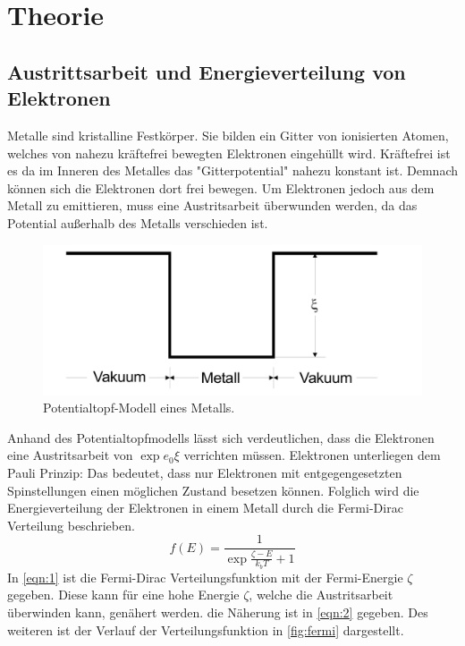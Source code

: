 \section{Theorie}
\label{sec:Theorie}
\subsection{Austrittsarbeit und Energieverteilung von Elektronen}
Metalle sind kristalline Festkörper. Sie bilden ein Gitter von 
ionisierten Atomen, welches von nahezu kräftefrei bewegten Elektronen 
eingehüllt wird. Kräftefrei ist es da im Inneren des Metalles das "Gitterpotential"
nahezu konstant ist. Demnach können sich die Elektronen dort frei bewegen. Um Elektronen jedoch 
aus dem Metall zu emittieren, muss eine Austritsarbeit überwunden werden, da das Potential außerhalb 
des Metalls verschieden ist.
\begin{figure}[H]
    \centering
        \centering
        \includegraphics[width=\textwidth]{Bilder/potentialtopf.jpg}
        \caption{Potentialtopf-Modell eines Metalls. \cite{anleitung4}}
    \hfill
    \label{fig:phasendiagramm}
\end{figure}
\noindent Anhand des Potentialtopfmodells lässt sich verdeutlichen, dass die Elektronen eine 
Austritsarbeit von $\exp e_0 \xi$ verrichten müssen.
\noindent Elektronen unterliegen dem Pauli Prinzip: Das bedeutet, dass nur Elektronen mit
entgegengesetzten Spinstellungen einen möglichen Zustand besetzen können.
Folglich wird die Energieverteilung der Elektronen in einem Metall durch die Fermi-Dirac Verteilung
beschrieben.
\begin{equation}
    \label{eqn:1}
    f\left(E\right) = \frac{1}{\exp{\frac{\zeta-E}{k_b T} + 1}}
\end{equation}
\noindent In \autoref{eqn:1} ist die Fermi-Dirac Verteilungsfunktion mit der Fermi-Energie
$\zeta$ gegeben. Diese kann für eine hohe Energie $\zeta$, welche die Austritsarbeit überwinden kann,
genähert werden. die Näherung ist in \autoref{eqn:2} 
gegeben. Des weiteren ist der Verlauf der Verteilungsfunktion in \autoref{fig:fermi} dargestellt.
